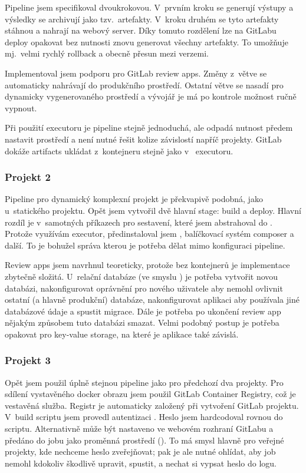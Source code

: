             Pipeline jsem specifikoval dvoukrokovou. V~prvním kroku se generují výstupy a výsledky se archivují jako tzv.~artefakty. V~kroku druhém  se tyto artefakty stáhnou a nahrají na webový server. Díky tomuto rozdělení lze na GitLabu deploy opakovat bez nutnosti znovu generovat všechny artefakty. To umožňuje mj.~velmi rychlý rollback a obecně přesun mezi verzemi.

            Implementoval jsem podporu pro GitLab review apps. Změny z~větve  se automaticky nahrávají do produkčního prostředí. Ostatní větve se nasadí pro dynamicky vygenerovaného prostředí a vývojář je má po kontrole možnost ručně vypnout.

            Při použití  executoru je pipeline stejně jednoduchá, ale odpadá nutnost předem nastavit prostředí a není nutné řešit kolize závislostí napříč projekty. GitLab dokáže artifacts ukládat z~kontejneru stejně jako v~ executoru.

        \newpage
        \subsubsection{Projekt 2}
            Pipeline pro dynamický komplexní projekt je překvapivě podobná, jako u~statického projektu. Opět jsem vytvořil dvě hlavní stage: build a deploy. Hlavní rozdíl je v~samotných příkazech pro sestavení, které jsem abstrahoval do . Protože využívám  executor, předinstaloval jsem , balíčkovací systém composer a další. To je bohužel správa kterou je potřeba dělat mimo konfiguraci pipeline.

            Review apps jsem navrhnul teoreticky, protože bez kontejnerů je implementace zbytečně složitá. U~relační databáze (ve smyslu ) je potřeba vytvořit novou databázi, nakonfigurovat oprávnění pro nového uživatele aby nemohl ovlivnit ostatní (a hlavně produkční) databáze, nakonfigurovat aplikaci aby používala jiné databázové údaje a spustit migrace. Dále je potřeba po ukončení review app nějakým způsobem tuto databázi smazat. Velmi podobný postup je potřeba opakovat pro key-value storage, na které je aplikace také závislá.

        \subsubsection{Projekt 3}
            Opět jsem použil úplně stejnou pipeline jako pro předchozí dva projekty. Pro sdílení vystavěného docker obrazu jsem použil GitLab Container Registry, což je vestavěná služba. Registr je automaticky založený při vytvoření GitLab projektu. V~build scriptu jsem provedl autentizaci . Heslo jsem hardcodoval rovnou do scriptu. Alternativně může být nastaveno ve webovém rozhraní GitLabu a předáno do jobu jako proměnná prostředí (). To má smysl hlavně pro veřejné projekty, kde nechceme heslo zveřejňovat; pak je ale nutné ohlídat, aby \CI job nemohl kdokoliv škodlivě upravit, spustit, a nechat si vypsat heslo do logu.

